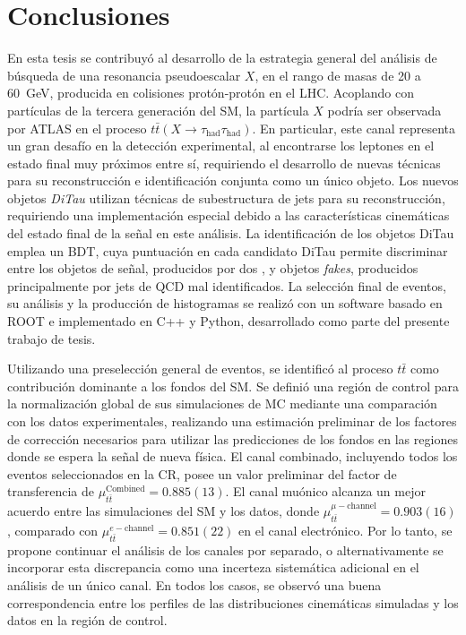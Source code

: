 \chapter*{Conclusiones}

En esta tesis se contribuyó al desarrollo de la estrategia general del análisis de búsqueda de una resonancia pseudoescalar $X$, en el rango de masas de \num{20} a \SI{60}{\GeV}, producida en colisiones protón-protón en el LHC. Acoplando con partículas de la tercera generación del SM, la partícula $X$ podría ser observada por ATLAS en el proceso $t\bar{t}(X \to \tau_{\text{had}} \tau_{\text{had}})$. En particular, este canal representa un gran desafío en la detección experimental, al encontrarse los leptones \ttau en el estado final muy próximos entre sí, requiriendo el desarrollo de nuevas técnicas para su reconstrucción e identificación conjunta como un único objeto. Los nuevos objetos \textit{DiTau} utilizan técnicas de subestructura de jets para su reconstrucción, requiriendo una implementación especial debido a las características cinemáticas del estado final de la señal en este análisis. La identificación de los objetos DiTau emplea un BDT, cuya puntuación en cada candidato DiTau permite discriminar entre los objetos de señal, producidos por dos \thads, y objetos \textit{fakes}, producidos principalmente por jets de QCD mal identificados. La selección final de eventos, su análisis y la producción de histogramas se realizó con un software basado en ROOT e implementado en C++ y Python, desarrollado como parte del presente trabajo de tesis.

Utilizando una preselección general de eventos, se identificó al proceso $t\bar{t}$ como contribución dominante a los fondos del SM. Se definió una región de control para la normalización global de sus simulaciones de MC mediante una comparación con los datos experimentales, realizando una estimación preliminar de los factores de corrección necesarios para utilizar las predicciones de los fondos en las regiones donde se espera la señal de nueva física. El canal combinado, incluyendo todos los eventos seleccionados en la CR, posee un valor preliminar del factor de transferencia de $\mu_{t\bar{t}}^{\text{Combined}} = 0.885(13)$. El canal muónico alcanza un mejor acuerdo entre las simulaciones del SM y los datos, donde $\mu_{t\bar{t}}^{\mu-\text{channel}} = 0.903(16)$, comparado con $\mu_{t\bar{t}}^{e-\text{channel}} = 0.851(22)$ en el canal electrónico. Por lo tanto, se propone continuar el análisis de los canales por separado, o alternativamente se incorporar esta discrepancia como una incerteza sistemática adicional en el análisis de un único canal. En todos los casos, se observó una buena correspondencia entre los perfiles de las distribuciones cinemáticas simuladas y los datos en la región de control.


